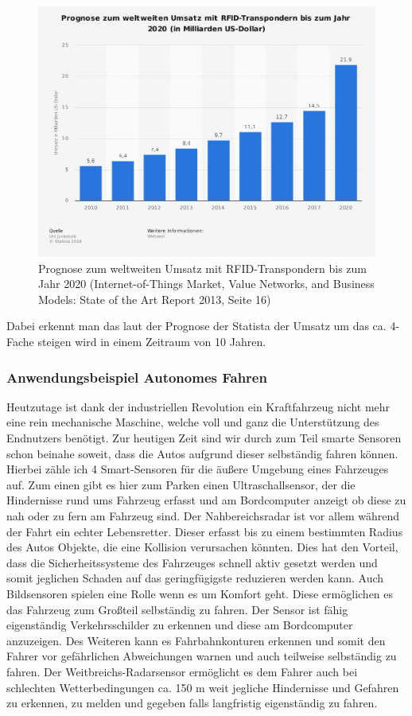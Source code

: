 \documentclass[a4paper,12pt]{scrartcl}
\begin{document}
\begin{figure}[H]
\centering
\includegraphics[scale=0.45]{picture/prognoserfid}
\caption{Prognose zum weltweiten Umsatz mit RFID-Transpondern bis zum Jahr 2020 (Internet-of-Things Market, Value Networks, and Business Models: State of the Art Report 2013, Seite 16)}
\label{fig:Prognose Umsatz RFID Sensors}
\end{figure}

Dabei erkennt man das laut der Prognose der Statista der Umsatz um das ca. 4-Fache steigen wird in einem Zeitraum von 10 Jahren.

\newpage
\subsubsection{Anwendungsbeispiel Autonomes Fahren}
Heutzutage ist dank der industriellen Revolution ein Kraftfahrzeug nicht mehr eine rein mechanische Maschine, welche voll und ganz die Unterstützung des Endnutzers benötigt. Zur heutigen Zeit sind wir durch zum Teil smarte Sensoren schon beinahe soweit, dass die Autos aufgrund dieser selbständig fahren können.
Hierbei zähle ich 4 Smart-Sensoren für die äußere Umgebung eines Fahrzeuges auf.
Zum einen gibt es hier zum Parken einen Ultraschallsensor, der die Hindernisse rund ums Fahrzeug erfasst und am Bordcomputer anzeigt ob diese zu nah oder zu fern am Fahrzeug sind.
Der Nahbereichsradar ist vor allem während der Fahrt ein echter Lebensretter. Dieser erfasst bis zu einem bestimmten Radius des Autos Objekte, die eine Kollision verursachen könnten. Dies hat den Vorteil, dass die Sicherheitssysteme des Fahrzeuges schnell aktiv gesetzt werden und somit jeglichen Schaden auf das geringfügigste reduzieren werden kann.
Auch Bildsensoren spielen eine Rolle wenn es um Komfort geht. Diese ermöglichen es das Fahrzeug zum Großteil selbständig zu fahren. Der Sensor ist fähig eigenständig Verkehrsschilder zu erkennen und diese am Bordcomputer anzuzeigen. Des Weiteren kann es Fahrbahnkonturen erkennen und somit den Fahrer vor gefährlichen Abweichungen warnen und auch teilweise selbständig zu fahren.
Der Weitbreichs-Radarsensor ermöglicht es dem Fahrer auch bei schlechten Wetterbedingungen ca. 150 m weit jegliche Hindernisse und Gefahren zu erkennen, zu melden und gegeben falls langfristig eigenständig zu fahren.
\cite[Seite 15]{Reif.2012}
\\
\end{document}
